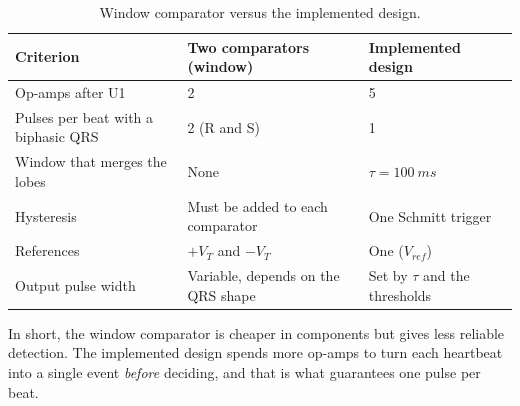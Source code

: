 \documentclass[11pt,letterpaper]{article}
\newcommand{\Vref}{V_{ref}}
\begin{document}
\begin{table}[H]
\centering
\caption{Window comparator versus the implemented design.}\label{tab:doscomp}
\small
\begin{tabularx}{\linewidth}{@{}>{\raggedright}p{3.6cm}>{\raggedright}p{5.2cm}X@{}}
\toprule
Criterion & Two comparators (window) & Implemented design \\
\midrule
Op-amps after U1 & 2 & 5 \\
Pulses per beat with a biphasic QRS & 2 (R and S) & 1 \\
Window that merges the lobes & None & $\tau=\SI{100}{ms}$ \\
Hysteresis & Must be added to each comparator & One Schmitt trigger \\
References & $+V_T$ and $-V_T$ & One ($\Vref$) \\
Output pulse width & Variable, depends on the QRS shape & Set by $\tau$ and the thresholds \\
\bottomrule
\end{tabularx}
\end{table}

In short, the window comparator is cheaper in components but gives less reliable detection. The implemented design spends more op-amps to turn each heartbeat into a single event \emph{before} deciding, and that is what guarantees one pulse per beat.
\end{document}

